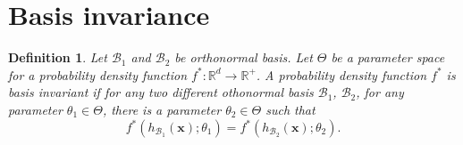 \documentclass[12pt, a4paper]{article}
\newtheorem{prop}{Proposition}
\newtheorem{definition}{Definition}
\begin{document}

{}

\newpage
\appendix
\section{Basis invariance}

\begin{definition}
Let $\mathcal{B}_1$ and $\mathcal{B}_2$ be orthonormal basis. Let $\Theta$ be a parameter space for a probability density function $f^*: \mathbb{R}^d \rightarrow \mathbb{R}^+$. 
A probability density function $f^*$ is \emph{basis invariant} if for any two different othonormal basis $\mathcal{B}_1$, $\mathcal{B}_2$, for any parameter $\theta_1 \in \Theta$, there is a parameter $\theta_2 \in \Theta$ such that
\[
f^*(h_{\mathcal{B}_1}(\textbf{x}); \theta_1) = f^*(h_{\mathcal{B}_2}(\textbf{x}); \theta_2).
\]

\end{definition}


% 
\end{document}
